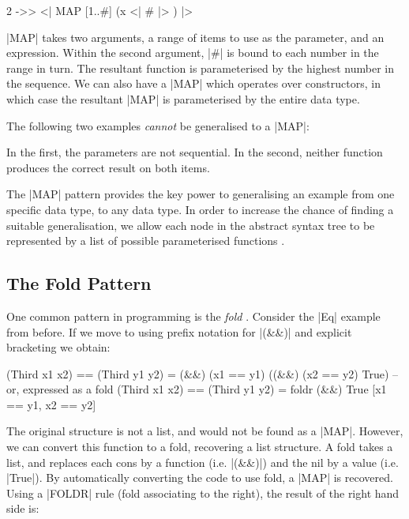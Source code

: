 \documentclass{llncs}
\begin{document}
\begin{code}
2 ->> <| MAP [1..#] (x <| # |> ) |>
\end{code}

|MAP| takes two arguments, a range of items to use as the parameter, and an expression. Within the second argument, |#| is bound to each number in the range in turn. The resultant function is parameterised by the highest number in the sequence. We can also have a |MAP| which operates over constructors, in which case the resultant |MAP| is parameterised by the entire data type.

The following two examples \textit{cannot} be generalised to a |MAP|:

\begin{code}
[1 ->> x <| # |>, 3 ->> x <| # |>]
[1 ->> x <| # |>, 2 ->> y <| # |>]
\end{code}

In the first, the parameters are not sequential. In the second, neither function produces the correct result on both items.

The |MAP| pattern provides the key power to generalising an example from one specific data type, to any data type. In order to increase the chance of finding a suitable generalisation, we allow each node in the abstract syntax tree to be represented by a list of possible parameterised functions \cite{wadler:list_successes}.


\subsection{The Fold Pattern}
\label{sec:fold}

One common pattern in programming is the \textit{fold} \cite{hutton:fold}. Consider the |Eq| example from before. If we move to using prefix notation for |(&&)| and explicit bracketing we obtain:

\begin{code}
(Third x1 x2) == (Third y1 y2) = (&&) (x1 == y1) ((&&) (x2 == y2) True)
 -- or, expressed as a fold
(Third x1 x2) == (Third y1 y2) = foldr (&&) True [x1 == y1, x2 == y2]
\end{code}

The original structure is not a list, and would not be found as a |MAP|. However, we can convert this function to a fold, recovering a list structure. A fold takes a list, and replaces each cons by a function (i.e. |(&&)|) and the nil by a value (i.e. |True|). By automatically converting the code to use fold, a |MAP| is recovered. Using a |FOLDR| rule (fold associating to the right), the result of the right hand side is:
\end{document}
